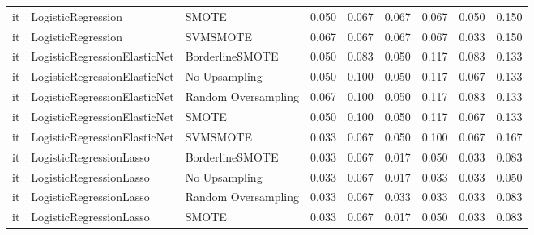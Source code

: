 \begin{tabular}{lllllllll}
      it &           LogisticRegression &               SMOTE & 0.050 &                     0.067 &                 0.067 &                  0.067 &                                   0.050 &     0.150 \\
      it &           LogisticRegression &            SVMSMOTE & 0.067 &                     0.067 &                 0.067 &                  0.067 &                                   0.033 &     0.150 \\
      it & LogisticRegressionElasticNet &     BorderlineSMOTE & 0.050 &                     0.083 &                 0.050 &                  0.117 &                                   0.083 &     0.133 \\
      it & LogisticRegressionElasticNet &       No Upsampling & 0.050 &                     0.100 &                 0.050 &                  0.117 &                                   0.067 &     0.133 \\
      it & LogisticRegressionElasticNet & Random Oversampling & 0.067 &                     0.100 &                 0.050 &                  0.117 &                                   0.083 &     0.133 \\
      it & LogisticRegressionElasticNet &               SMOTE & 0.050 &                     0.100 &                 0.050 &                  0.117 &                                   0.067 &     0.133 \\
      it & LogisticRegressionElasticNet &            SVMSMOTE & 0.033 &                     0.067 &                 0.050 &                  0.100 &                                   0.067 &     0.167 \\
      it &      LogisticRegressionLasso &     BorderlineSMOTE & 0.033 &                     0.067 &                 0.017 &                  0.050 &                                   0.033 &     0.083 \\
      it &      LogisticRegressionLasso &       No Upsampling & 0.033 &                     0.067 &                 0.017 &                  0.033 &                                   0.033 &     0.050 \\
      it &      LogisticRegressionLasso & Random Oversampling & 0.033 &                     0.067 &                 0.033 &                  0.033 &                                   0.033 &     0.083 \\
      it &      LogisticRegressionLasso &               SMOTE & 0.033 &                     0.067 &                 0.017 &                  0.050 &                                   0.033 &     0.083 \\

\end{tabular}
